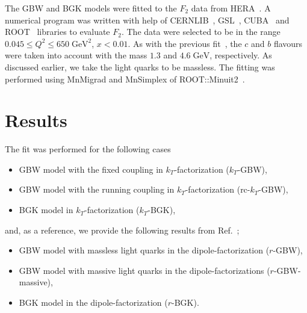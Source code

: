 \documentclass[12pt]{article}
\numberwithin{equation}{section}
\numberwithin{table}{section}
\numberwithin{figure}{section}
\begin{document}
The GBW and BGK models were fitted to the $F_2$ data from HERA~\cite{Abt:2017nkc}. A numerical program was written with help of CERNLIB~\cite{Kolbig:1972zz}, GSL~\cite{GSL}, CUBA~\cite{Hahn:2004fe} and ROOT~\cite{Brun:1997pa} libraries to evaluate $F_2$. The data were selected to be in the range $0.045\leq Q^2\leq 650\;\mathrm{GeV^2}$, $x<0.01$.
As with the previous fit~\cite{Goda:2022wsc}, the $c$ and $b$ flavours were taken into account with the mass $1.3$ and $4.6\;\mathrm{GeV}$, respectively. As discussed earlier, we take the light quarks to be massless.
The fitting was performed using MnMigrad and MnSimplex of ROOT::Minuit2~\cite{James:2004xla}.

%
\section{Results}
\label{Results}
%
The fit was performed for the following cases
\begin{itemize}
\item GBW model with the fixed coupling in $k_T$-factorization  ($k_T$-GBW),
\item GBW model with the running coupling in $k_T$-factorization (rc-$k_T$-GBW),
\item BGK model in $k_T$-factorization ($k_T$-BGK),
\end{itemize} 
and, as a reference, we provide the following results from Ref.~\cite{Goda:2022wsc};
\begin{itemize}
\item GBW model with massless light quarks in the dipole-factorization ($r$-GBW),
\item GBW model with massive light quarks in the dipole-factorizations ($r$-GBW-massive),
\item  BGK model in  the dipole-factorization ($r$-BGK).
\end{itemize} 
\end{document}
